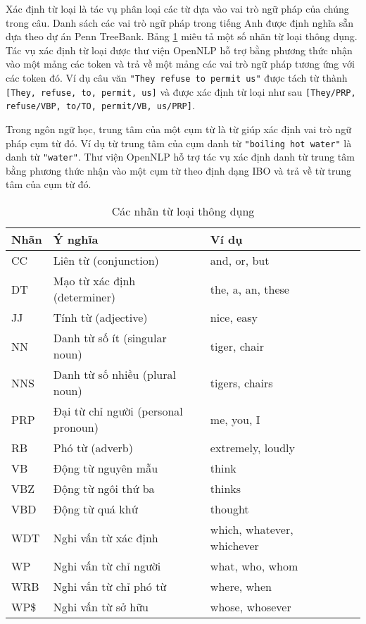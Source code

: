 Xác định từ loại là tác vụ phân loại các từ dựa vào vai trò ngữ pháp của chúng trong câu. Danh sách các vai trò ngữ pháp trong tiếng Anh được định nghĩa sẵn dựa theo dự án Penn TreeBank. Bảng \ref{tab:POSTag} miêu tả một số nhãn từ loại thông dụng. Tác vụ xác định từ loại được thư viện OpenNLP hỗ trợ bằng phương thức nhận vào một mảng các token và trả về một mảng các vai trò ngữ pháp tương ứng với các token đó. Ví dụ câu văn \texttt{"They refuse to permit us"} được tách từ thành \texttt{[They, refuse, to, permit, us]} và được xác định từ loại như sau \texttt{[They/PRP, refuse/VBP, to/TO, permit/VB, us/PRP]}.

Trong ngôn ngữ học, trung tâm của một cụm từ là từ giúp xác định vai trò ngữ pháp cụm từ đó. Ví dụ từ trung tâm của cụm danh từ \texttt{"boiling hot water"} là danh từ \texttt{"water"}. Thư viện OpenNLP hỗ trợ tác vụ xác định danh từ trung tâm bằng phương thức nhận vào một cụm từ theo định dạng IBO và trả về từ trung tâm của cụm từ đó.

\begin{table}[t]
\centering{}
\caption{Các nhãn từ loại thông dụng \label{tab:POSTag}}
\footnotesize\sffamily

\begin{tabularx}{0.8\textwidth}{@{}l *5{>{\arraybackslash}X}@{}}
\toprule 
\textbf{Nhãn} & \textbf{Ý nghĩa} & \textbf{Ví dụ}\\
\midrule
CC & Liên từ (conjunction) & and, or, but\\
DT & Mạo từ xác định (determiner) & the, a, an, these\\
JJ & Tính từ (adjective) & nice, easy \\
NN & Danh từ số ít (singular noun) & tiger, chair \\
NNS & Danh từ số nhiều (plural noun) & tigers, chairs \\
PRP & Đại từ chỉ người (personal pronoun) & me, you, I \\
RB & Phó từ (adverb) & extremely, loudly \\
VB & Động từ nguyên mẫu & think  \\
VBZ & Động từ ngôi thứ ba & thinks \\
VBD & Động từ quá khứ & thought \\
WDT & Nghi vấn từ xác định & which, whatever, whichever\\
WP & Nghi vấn từ chỉ người & what, who, whom \\
WRB & Nghi vấn từ chỉ phó từ & where, when \\
WP\$ & Nghi vấn từ sở hữu & whose, whosever \\
\bottomrule
\end{tabularx}
\end{table}

